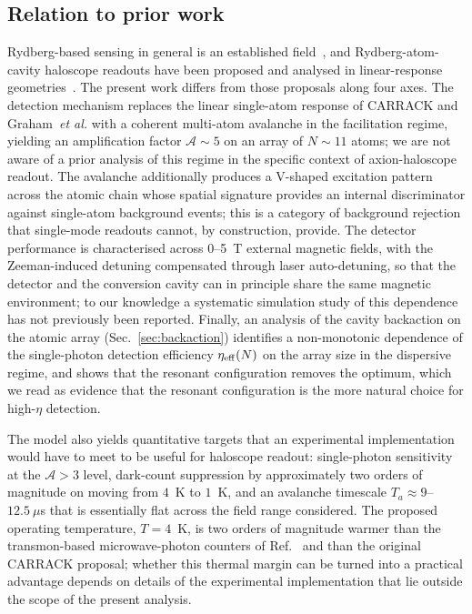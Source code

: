 \subsection*{Relation to prior work}

Rydberg-based sensing in general is an established field~\cite{saffman2010quantum, mohapatra2007coherent, ravets2014coherent}, and Rydberg-atom-cavity haloscope readouts have been proposed and analysed in linear-response geometries~\cite{Yamamoto2001,Tada1999,Graham2024}. The present work differs from those proposals along four axes. The detection mechanism replaces the linear single-atom response of CARRACK and Graham~\emph{et al.} with a coherent multi-atom avalanche in the facilitation regime, yielding an amplification factor $\mathcal{A}\!\sim\!5$ on an array of $N \sim 11$ atoms; we are not aware of a prior analysis of this regime in the specific context of axion-haloscope readout. The avalanche additionally produces a V-shaped excitation pattern across the atomic chain whose spatial signature provides an internal discriminator against single-atom background events; this is a category of background rejection that single-mode readouts cannot, by construction, provide. The detector performance is characterised across 0--5~T external magnetic fields, with the Zeeman-induced detuning compensated through laser auto-detuning, so that the detector and the conversion cavity can in principle share the same magnetic environment; to our knowledge a systematic simulation study of this dependence has not previously been reported. Finally, an analysis of the cavity backaction on the atomic array (Sec.~\ref{sec:backaction}) identifies a non-monotonic dependence of the single-photon detection efficiency $\eta_{\rm eff}(N)$ on the array size in the dispersive regime, and shows that the resonant configuration removes the optimum, which we read as evidence that the resonant configuration is the more natural choice for high-$\eta$ detection.

The model also yields quantitative targets that an experimental implementation would have to meet to be useful for haloscope readout: single-photon sensitivity at the $\mathcal{A}>3$ level, dark-count suppression by approximately two orders of magnitude on moving from $4$~K to $1$~K, and an avalanche timescale $T_a \approx 9$--$12.5~\mu$s that is essentially flat across the field range considered. The proposed operating temperature, $T = 4$~K, is two orders of magnitude warmer than the transmon-based microwave-photon counters of Ref.~\cite{Dixit2025} and than the original CARRACK proposal; whether this thermal margin can be turned into a practical advantage depends on details of the experimental implementation that lie outside the scope of the present analysis.

